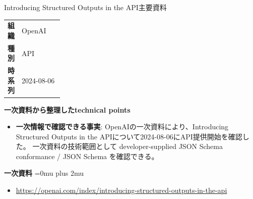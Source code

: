 \begin{technicalnote}{Introducing Structured Outputs in the API}{主要資料}
\begingroup
\begin{tabularx}{\linewidth}{@{}>{\bfseries}p{0.22\linewidth}X@{}}
組織 & OpenAI \\
種別 & API \\
時系列 & 2024-08-06 \\
\end{tabularx}
\smallskip
{\bfseries 一次資料から整理したtechnical points}
\begin{itemize}[leftmargin=1.5em,itemsep=0.35em]
\item \textbf{一次情報で確認できる事実}: OpenAIの一次資料により、Introducing Structured Outputs in the APIについて2024-08-06にAPI提供開始を確認した。 一次資料の技術範囲として developer-supplied JSON Schema conformance / JSON Schema を確認できる。
\end{itemize}
\begin{minipage}{\linewidth}
\begin{samepage}
{\bfseries 一次資料}
\begingroup\sloppy
\Urlmuskip=0mu plus 2mu\relax
\begin{itemize}[leftmargin=1.5em,itemsep=0.25em]
\item {\scriptsize\url{https://openai.com/index/introducing-structured-outputs-in-the-api}}
\end{itemize}
\endgroup
\end{samepage}
\end{minipage}
\endgroup
\end{technicalnote}
\medskip

